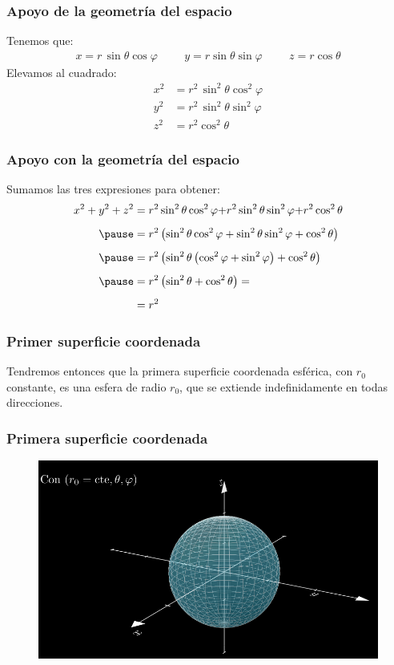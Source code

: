 \documentclass[12pt]{beamer}
\begin{document}
\begin{frame}
\frametitle{Apoyo de la geometría del espacio}
Tenemos que:
\begin{align*}
x = r \, \sin \theta \cos \varphi \hspace{1cm} y = r \sin \theta \sin \varphi \hspace{1cm} z = r \cos \theta
\end{align*}
\pause
Elevamos al cuadrado:
\begin{align*}
x^{2} &= r^{2} \, \sin^{2} \theta \cos^{2} \varphi \\[0.25em]
y^{2} &= r^{2} \, \sin^{2} \theta \sin^{2} \varphi \\[0.25em]
z^{2} &= r^{2} \cos^{2} \theta
\end{align*}
\end{frame}
\begin{frame}
\frametitle{Apoyo con la geometría del espacio}
Sumamos las tres expresiones para obtener:
\pause
\begin{eqnarray*}
\begin{aligned}
x^{2} + y^{2} + z^{2} &= r^{2} \sin^{2} \theta \cos^{2} \varphi {+} r^{2} \sin^{2} \theta \sin^{2} \varphi {+} r^{2} \cos^{2} \theta \\[0.5em] \pause
&= r^{2} \left( \sin^{2} \theta \cos^{2} \varphi + \sin^{2} \theta \sin^{2} \varphi + \cos^{2} \theta \right) \\[0.5em] \pause
&= r^{2} \left( \sin^{2} \theta \left( \cos^{2} \varphi + \sin^{2} \varphi \right) + \cos^{2} \theta \right) \\[0.5em] \pause
&= r^{2} \left( \sin^{2} \theta + \cos^{2} \theta \right) = \\[0.5em]
&=  r^{2}
\end{aligned}
\end{eqnarray*}
\end{frame}
\begin{frame}
\frametitle{Primer superficie coordenada}
Tendremos entonces que la primera superficie coordenada esférica, con $r_{0}$ constante, es una esfera de radio $r_{0}$, que se extiende indefinidamente en todas direcciones.
\end{frame}
{ %
\begin{frame}
\frametitle{Primera superficie coordenada}
\begin{figure}
   \centering
   \includegraphics[width=0.95\linewidth]{Imagenes/superficies_esfericas_01.png}
   \label{fig:superficies_esfericas_01}
\end{figure}
\end{frame}
}
\end{document}
